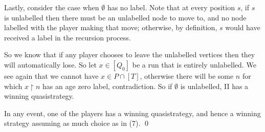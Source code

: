 \documentclass[]{article}
\begin{document}
\begin{enumerate}[label = (\arabic*)]
    Lastly, consider the case when $\emptyset$ has no label. Note that at every position $s$, if $s$ is unlabelled then there must be an unlabelled node to move to, and no node labelled with the player making that move; otherwise, by definition, $s$ would have received a label in the recursion process.

    So we know that if any player chooses to leave the unlabelled vertices then they will automatically lose. So let $x \in [Q_0]$ be a run that is entirely unlabelled. We see again that we cannot have $x \in P\cap [T]$, otherwise there will be some $n$ for which $x\restriction n$ has an age zero label, contradiction. So if $\emptyset$ is unlabelled, II has a winning quasistrategy.

    In any event, one of the players has a winning quasistrategy, and hence a winning strategy assuming as much choice as in (7). \qed
\end{enumerate}
\end{document}
